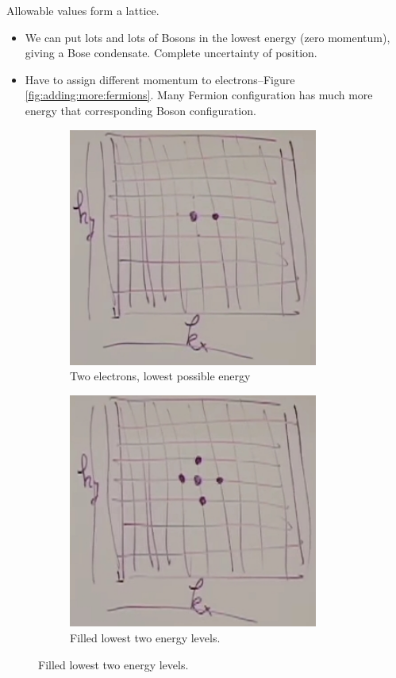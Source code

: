 \documentclass[]{article}
\begin{document}
Allowable values form a lattice.
\begin{itemize}
	\item We can put lots and lots of Bosons in the lowest energy (zero momentum), giving a Bose condensate. Complete uncertainty of position.
	\item Have to assign different momentum to electrons--Figure \ref{fig:adding:more:fermions}. Many Fermion configuration has much more energy that corresponding Boson configuration. 
\end{itemize}


\begin{figure}[H]
	\caption{Adding more Fermions}\label{fig:adding:more:fermions}
	\begin{subfigure}{0.32\textwidth}
		\caption{Two electrons, lowest possible energy}\label{fig:electons:lowest:energy}
		\includegraphics[width=0.9\textwidth]{electons-lowest-energy}
	\end{subfigure}
	\begin{subfigure}{0.32\textwidth}
		\caption{Filled lowest two energy levels.}
		\includegraphics[width=0.9\textwidth]{5-electrons}

\end{subfigure}
\end{figure}
\end{document}
